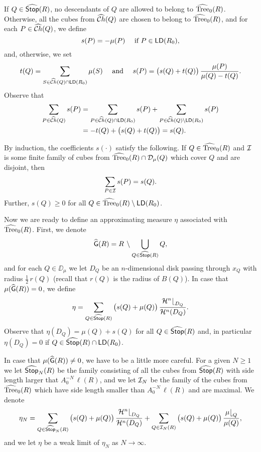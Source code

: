 \noi If $Q\in{\widehat{{\mathsf {Stop}}}}(R)$, no descendants of $Q$ are allowed to belong to ${\widehat{{\rm Tree}}}_0(R)$.
Otherwise, all the cubes from ${\widehat{{\mathcal Ch}}}(Q)$ are chosen to belong to ${\widehat{{\rm Tree}}}_0(R)$, and for each $P\in{\widehat{{\mathcal Ch}}}(Q)$, we define
$$s(P)=-\mu(P) \quad \mbox{ if $P\in{\mathsf{LD}}(R_0)$,}$$
and, otherwise, we set 
\begin{equation}\label{eqdqaq14}
t(Q) = \sum_{S\in{\widehat{{\mathcal Ch}}}(Q)\cap{\mathsf{LD}}(R_0)}\mu(S)\quad \mbox{ and }\quad
s(P) = \big(s(Q) + t(Q)\big)\, 
\frac{\mu(P)}{\mu(Q)-t(Q)}.
\end{equation}
Observe that
\begin{align*}
\sum_{P\in{\widehat{{\mathcal Ch}}}(Q)}s(P) & = \sum_{P\in{\widehat{{\mathcal Ch}}}(Q)\cap {\mathsf{LD}}(R_0)} s(P) + \sum_{P\in{\widehat{{\mathcal Ch}}}(Q)\setminus {\mathsf{LD}}(R_0)}s(P) \\
& = -t(Q) + \big(s(Q) + t(Q)\big) = s(Q).
\end{align*}

By induction, the coefficients $s(\cdot)$ satisfy the following.
If $Q\in{\widehat{{\rm Tree}}}_0(R)$ and ${\mathcal I}$ is some finite family of cubes from ${\widehat{{\rm Tree}}}_0(R)\cap{\mathcal D}_\mu(Q)$
which cover $Q$ and are disjoint, then
\begin{equation}\label{eqaq89}
\sum_{P\in {\mathcal I}} s(P) = s(Q).
\end{equation}
Further, $s(Q)\geq0$ for all $Q\in{\widehat{{\rm Tree}}}_0(R)\setminus {\mathsf{LD}}(R_0)$.

Now we are ready to define an approximating measure $\eta$ associated with ${\widehat{{\rm Tree}}}_0(R)$. 
First, we denote
$${\widehat{{\mathsf{G}}}}(R) = R\,\setminus \bigcup_{Q\in{\widehat{{\mathsf {Stop}}}}(R)} Q,$$
and for each $Q\in\DD_\mu$ we let $D_Q$ be an $n$-dimensional disk passing through $x_Q$
with radius $\frac12 \,r(Q)$ (recall that $r(Q)$ is the radius of $B(Q)$).
In  case that $\mu({\widehat{{\mathsf{G}}}}(R))=0$, we define
$$\eta = \sum_{Q\in{\widehat{{\mathsf {Stop}}}}(R)} \big(s(Q) + \mu(Q)\big)\,\frac{{\mathcal H}^n{\lfloor}_{D_Q}}{{\mathcal H}^n(D_Q)}.$$
Observe that $\eta(D_Q)=\mu(Q)+ s(Q)$ for all $Q\in{\widehat{{\mathsf {Stop}}}}(R)$ and, in particular $\eta(D_Q)=0$
if $Q\in{\widehat{{\mathsf {Stop}}}}(R)\cap{\mathsf{LD}}(R_0)$.

In case that $\mu({\widehat{{\mathsf{G}}}}(R))\neq0$, we have to be a little more careful. For a given
$N\geq1$ we let ${\widehat{{\mathsf {Stop}}}}_N(R)$ be the family consisting of all the cubes from 
${\widehat{{\mathsf {Stop}}}}(R)$ with side length larger that $A_0^{-N}\,\ell(R)$, and we let ${\mathcal I}_N$ be the family of the cubes from $
{\widehat{{\rm Tree}}}_0(R)$ which have side length smaller than $A_0^{-N}\,\ell(R)$ and are maximal.
We denote 
\begin{equation}\label{eqdefetaN}
\eta_N = \sum_{Q\in{\widehat{{\mathsf {Stop}}}}_N(R)} \big(s(Q) + \mu(Q)\big)\,\frac{{\mathcal H}^n{\lfloor}_{D_Q}}{{\mathcal H}^n(D_Q)}+
\sum_{Q\in {\mathcal I}_N(R)} \big(s(Q) + \mu(Q)\big)\,\frac{\mu{\lfloor}_Q}{\mu(Q)}
,
\end{equation}
and we let $\eta$ be a weak limit of $\eta_N$ as $N\to\infty$.

